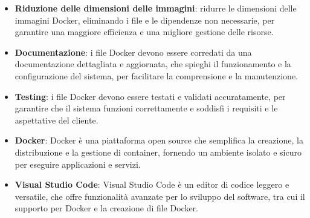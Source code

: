 \begin{itemize}
	\item \textbf{Riduzione delle dimensioni delle immagini}: ridurre le dimensioni delle immagini Docker, eliminando i file e le dipendenze non necessarie, per garantire una maggiore efficienza e una migliore gestione delle risorse.
	\item \textbf{Documentazione}: i file Docker devono essere corredati da una documentazione dettagliata e aggiornata, che spieghi il funzionamento e la configurazione del sistema, per facilitare la comprensione e la manutenzione.
	\item \textbf{Testing}: i file Docker devono essere testati e validati accuratamente, per garantire che il sistema funzioni correttamente e soddisfi i requisiti e le aspettative del cliente.
\end{itemize}

\begin{itemize}
	\item \textbf{Docker}: Docker è una piattaforma open source che semplifica la creazione, la distribuzione e la gestione di container, fornendo un ambiente isolato e sicuro per eseguire applicazioni e servizi.
	\item \textbf{Visual Studio Code}: Visual Studio Code è un editor di codice leggero e versatile, che offre funzionalità avanzate per lo sviluppo del software, tra cui il supporto per Docker e la creazione di file Docker.
\end{itemize}